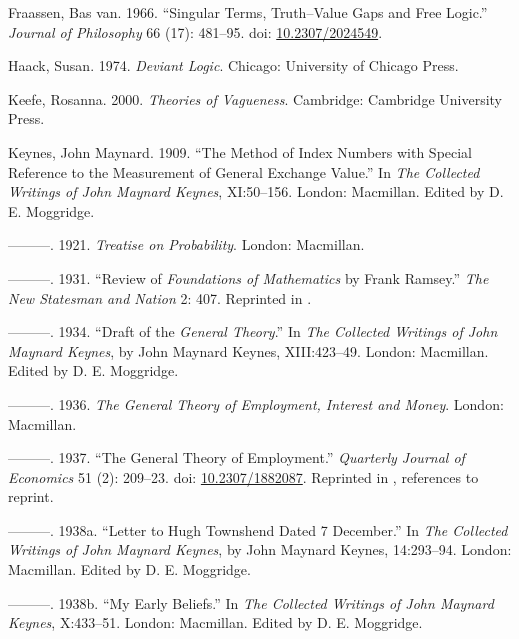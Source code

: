 \documentclass[
  11pt,
  letterpaper,
  DIV=11,
  numbers=noendperiod,
  twoside]{scrartcl}
\newlength{\cslhangindent}
\newenvironment{CSLReferences}[2] %
 {\begin{list}{}{%
  \setlength{\itemindent}{0pt}
  \setlength{\leftmargin}{0pt}
  \setlength{\parsep}{0pt}
  \ifodd #1
   \setlength{\leftmargin}{\cslhangindent}
   \setlength{\itemindent}{-1\cslhangindent}
  \fi
  \setlength{\itemsep}{#2\baselineskip}}}
 {\end{list}}
\begin{document}
\begin{CSLReferences}{1}{0}
Fraassen, Bas van. 1966. {``Singular Terms, Truth--Value Gaps and Free
Logic.''} \emph{Journal of Philosophy} 66 (17): 481--95. doi:
\href{https://doi.org/10.2307/2024549}{10.2307/2024549}.

Haack, Susan. 1974. \emph{Deviant Logic}. Chicago: University of Chicago
Press.

Keefe, Rosanna. 2000. \emph{Theories of Vagueness}. Cambridge: Cambridge
University Press.

Keynes, John Maynard. 1909. {``The Method of Index Numbers with Special
Reference to the Measurement of General Exchange Value.''} In \emph{The
Collected Writings of John Maynard Keynes}, XI:50--156. London:
Macmillan. Edited by D. E. Moggridge.

---------. 1921. \emph{Treatise on Probability}. London: Macmillan.

---------. 1931. {``Review of \emph{Foundations of Mathematics} by Frank
Ramsey.''} \emph{The New Statesman and Nation} 2: 407. Reprinted in
\cite[X 336-339]{KeynesCW}.

---------. 1934. {``Draft of the \emph{General Theory}.''} In \emph{The
Collected Writings of John Maynard Keynes}, by John Maynard Keynes,
XIII:423--49. London: Macmillan. Edited by D. E. Moggridge.

---------. 1936. \emph{The General Theory of Employment, Interest and
Money}. London: Macmillan.

---------. 1937. {``The General Theory of Employment.''} \emph{Quarterly
Journal of Economics} 51 (2): 209--23. doi:
\href{https://doi.org/10.2307/1882087}{10.2307/1882087}. Reprinted in
\cite[XIV 109-123]{KeynesCW}, references to reprint.

---------. 1938a. {``Letter to Hugh Townshend Dated 7 December.''} In
\emph{The Collected Writings of John Maynard Keynes}, by John Maynard
Keynes, 14:293--94. London: Macmillan. Edited by D. E. Moggridge.

---------. 1938b. {``My Early Beliefs.''} In \emph{The Collected
Writings of John Maynard Keynes}, X:433--51. London: Macmillan. Edited
by D. E. Moggridge.


\end{CSLReferences}
\end{document}

